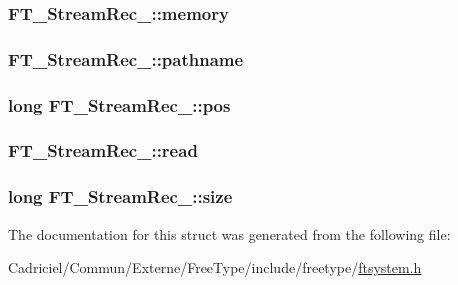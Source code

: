 \hypertarget{struct_f_t___stream_rec___a51e2be0d80d70b532aae3face5461e7e}{
\subsubsection[{memory}]{ F\-T\-\_\-\-Stream\-Rec\-\_\-\-::memory}}\label{struct_f_t___stream_rec___a51e2be0d80d70b532aae3face5461e7e}
\hypertarget{struct_f_t___stream_rec___afd75c5de5ed78c484a200a7e97ef5a41}{
\subsubsection[{pathname}]{ F\-T\-\_\-\-Stream\-Rec\-\_\-\-::pathname}}\label{struct_f_t___stream_rec___afd75c5de5ed78c484a200a7e97ef5a41}
\hypertarget{struct_f_t___stream_rec___a5bf82c2ff4554752edfeec442fba2f33}{
\subsubsection[{pos}]{ {\bf long} F\-T\-\_\-\-Stream\-Rec\-\_\-\-::pos}}\label{struct_f_t___stream_rec___a5bf82c2ff4554752edfeec442fba2f33}
\hypertarget{struct_f_t___stream_rec___af724049d0258d4988c2b11c3a08b1b05}{
\subsubsection[{read}]{ F\-T\-\_\-\-Stream\-Rec\-\_\-\-::read}}\label{struct_f_t___stream_rec___af724049d0258d4988c2b11c3a08b1b05}
\hypertarget{struct_f_t___stream_rec___ab00e3cf802c950d0ca5a022a06953123}{
\subsubsection[{size}]{ {\bf long} F\-T\-\_\-\-Stream\-Rec\-\_\-\-::size}}\label{struct_f_t___stream_rec___ab00e3cf802c950d0ca5a022a06953123}


The documentation for this struct was generated from the following file\-:\begin{DoxyCompactItemize}
\item 
Cadriciel/\-Commun/\-Externe/\-Free\-Type/include/freetype/\hyperlink{ftsystem_8h}{ftsystem.\-h}\end{DoxyCompactItemize}
